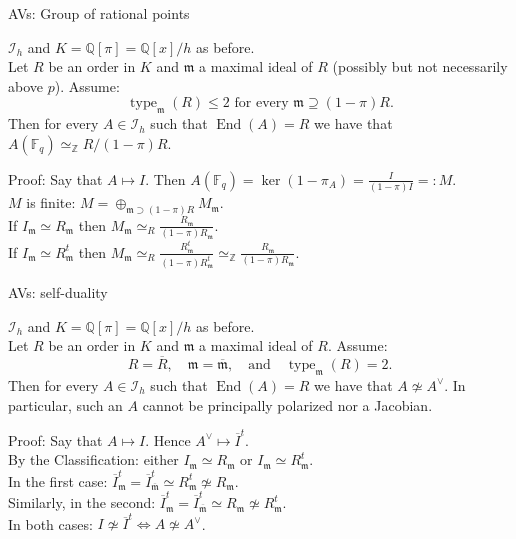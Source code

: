 \documentclass[usenames,dvipsnames]{beamer}
\def\Q{\mathbb{Q}}
\def\Z{\mathbb{Z}}
\def\F{\mathbb{F}}
\DeclareMathOperator{\End}{End}
\DeclareMathOperator{\type}{type}
\renewcommand{\frm}{{\mathfrak m}}
\begin{document}
\begin{frame}{ AVs: Group of rational points }
    \begin{theorem}[ Springer-M. ]
        $\mathcal{I}_h$ and $K=\Q[\pi]=\Q[x]/h$ as before.\\
        \pause Let $R$ be an order in $K$ and $\frm$ a maximal ideal of $R$ (possibly but not necessarily above $p$). 
        \pause Assume:
        \[ \type_\frm(R) \leq 2 \text{ for every }\frm \supseteq (1-\pi)R.\]
        \pause Then for every $A \in \mathcal{I}_h$ such that $\End(A)=R$ we have that $A(\F_q) \simeq_\Z R/(1-\pi)R$.
    \end{theorem}
    \pause Proof: Say that $A \mapsto I$. Then $A(\F_q) = \ker(1-\pi_A) = \frac{I}{(1-\pi)I}=:M$.\\
    \pause $M$ is finite: $M=\oplus_{\frm \supset (1-\pi)R} M_\frm$.\\
    \pause If $I_\frm\simeq R_\frm$ then $M_\frm \simeq_R \frac{R_\frm}{(1-\pi)R_\frm}$.\\
    \pause If $I_\frm \simeq R^t_\frm$ then $M_\frm \simeq_R \frac{R^t_\frm}{(1-\pi)R^t_\frm} \simeq_\Z \frac{R_\frm}{(1-\pi)R_\frm}$.
\end{frame}

\begin{frame}{ AVs: self-duality }
    \begin{theorem}[ Springer-M. ]
        $\mathcal{I}_h$ and $K=\Q[\pi]=\Q[x]/h$ as before.\\
        \pause Let $R$ be an order in $K$ and $\frm$ a maximal ideal of $R$. 
        \pause Assume:
        \[ R=\overline{R}, \quad \frm = \overline{\frm},\quad \text{and}\quad \type_\frm(R) = 2 .\]
        \pause Then for every $A \in \mathcal{I}_h$ such that $\End(A)=R$ we have that $A\not\simeq A^\vee$. 
        \pause In particular, such an $A$ cannot be principally polarized nor a Jacobian.
    \end{theorem}
    \pause Proof: Say that $A \mapsto I$. Hence $A^\vee \mapsto \overline{I}^t$.\\
    \pause By the Classification: either $I_\frm\simeq R_\frm$ or $I_\frm\simeq R_\frm^t$.\\
    \pause In the first case: $\overline{I}_\frm^t = \overline{I}_{\overline{\frm}}^t \simeq R^t_\frm \not\simeq R_\frm$.\\
    \pause Similarly, in the second: $\overline{I}_\frm^t = \overline{I}_{\overline{\frm}}^t \simeq R_\frm \not\simeq R_\frm^t$.\\
    \pause In both cases: $I\not\simeq \overline{I}^t \iff A\not \simeq A^\vee$.
\end{frame}
\end{document}
